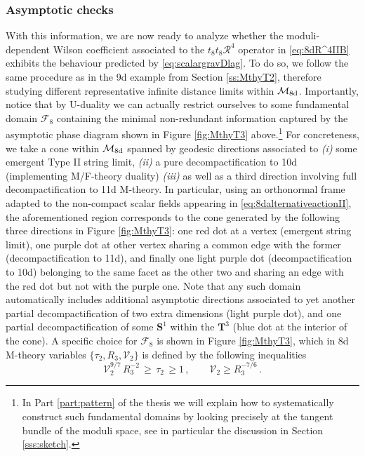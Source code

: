 \subsubsection*{Asymptotic checks}

With this information, we are now ready to analyze whether the moduli-dependent Wilson coefficient associated to the  $t_8 t_8 \mathcal{R}^4$ operator in \eqref{eq:8dR^4IIB} exhibits the behaviour predicted by \eqref{eq:scalargravDlag}. To do so, we follow the same procedure as in the 9d example from Section \ref{ss:MthyT2}, therefore studying different representative infinite distance limits within $\mathcal{M}_{\rm 8d}$. Importantly, notice that by U-duality we can actually restrict ourselves to some fundamental domain $\mathscr{F}_8$ containing the minimal non-redundant information captured by the asymptotic phase diagram shown in Figure \ref{fig:MthyT3} above.\footnote{In Part \ref{part:pattern} of the thesis we will explain how to systematically construct such fundamental domains by looking precisely at the tangent bundle of the moduli space, see in particular the discussion in Section \ref{sss:sketch}.} For concreteness, we take a cone within $\mathcal{M}_{\rm 8d}$ spanned by geodesic directions associated to \emph{(i)} some emergent Type II string limit, \emph{(ii)} a pure decompactification to 10d (implementing M/F-theory duality) \emph{(iii)} as well as a third direction involving full decompactification to 11d M-theory. In particular, using an orthonormal frame adapted to the non-compact scalar fields appearing in \eqref{eq:8dalternativeactionII}, the aforementioned region corresponds to the cone generated by the following three directions in Figure \ref{fig:MthyT3}: one red dot at a vertex (emergent string limit), one purple dot at other vertex sharing a common edge with the former (decompactification to 11d), and finally one light purple dot (decompactification to 10d) belonging to the same facet as the other two and sharing an edge with the red dot but not with the purple one. Note that any such domain automatically includes additional asymptotic directions associated to yet another partial decompactification of two extra dimensions (light purple dot), and one partial decompactification of some $\mathbf{S}^1$ within the $\mathbf{T}^3$ (blue dot at the interior of the cone). A specific choice for $\mathscr{F}_8$ is shown in Figure \ref{fig:MthyT3}, which in 8d M-theory variables $\lbrace \tau_2, R_3, \mathcal{V}_2 \rbrace$ is defined by the following inequalities
%
\begin{equation}
    \label{eq:funddomainT3}
\mathcal{V}_2^{9/7} \, R_3^{-2}\,  \geq\, \tau_2\, \geq 1 \, ,  \qquad \mathcal{V}_2 \geq R_3^{-7/6} \, .
\end{equation}
